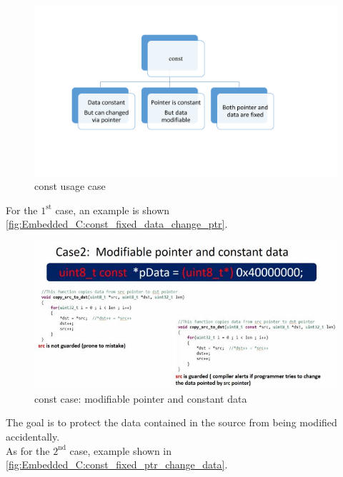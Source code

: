 \begin{figure}[h]
\centering
\includegraphics[scale=0.5]{Figures/Embedded_C/const_usage_case}
\caption{const usage case}
\label{fig:Embedded_C:const_usage_case}
\end{figure} 

\newpage
For the $1^{\mathrm{st}}$ case, an example is shown \autoref{fig:Embedded_C:const_fixed_data_change_ptr}.

\begin{figure}[h]
\centering
\includegraphics[scale=0.7]{Figures/Embedded_C/const_fixed_data_change_ptr}
\caption{const case: modifiable pointer and constant data }
\label{fig:Embedded_C:const_fixed_data_change_ptr}
\end{figure} 

The goal is to protect the data contained in the source from being modified accidentally.\\

As for the $2^{\mathrm{nd}}$ case, example shown in \autoref{fig:Embedded_C:const_fixed_ptr_change_data}.

